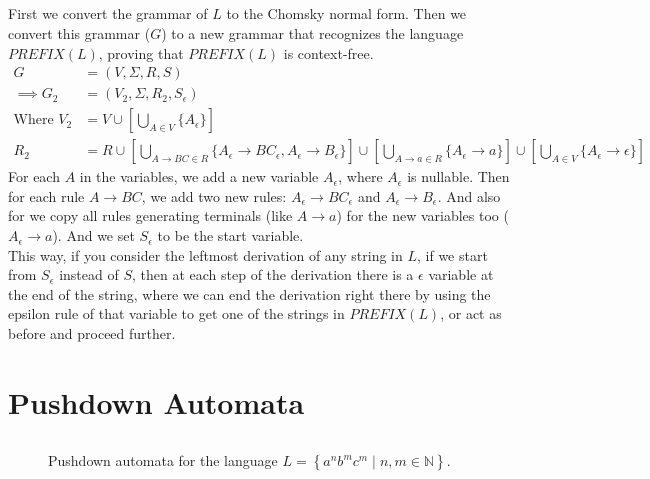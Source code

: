 \documentclass{article}
\numberwithin{equation}{subsection}
\begin{document}
\subsection{}
First we convert the grammar of \(L\) to the Chomsky normal form. Then we convert this grammar (\(G\)) to a new grammar that recognizes the language \(PREFIX(L)\), proving that \(PREFIX(L)\) is context-free.
\begin{align*}
G &= (V, \Sigma, R, S)\\
\implies G_2 &= (V_2, \Sigma, R_2, S_\epsilon)\\
\text{Where } V_2 &= V \cup \left[\bigcup_{A \in V} \{A_\epsilon\}\right]\\
R_2 &= R \cup \left[\bigcup_{A\rightarrow BC \in R} \{A_\epsilon \rightarrow BC_\epsilon, A_\epsilon \rightarrow B_\epsilon\}\right] \cup \left[\bigcup_{A \rightarrow a \in R} \{A_\epsilon \rightarrow a\}\right] \cup \left[\bigcup_{A \in V} \{A_\epsilon \rightarrow \epsilon\}\right]
\end{align*}
For each \(A\) in the variables, we add a new variable \(A_\epsilon\), where \(A_\epsilon\) is nullable.
Then for each rule \(A \rightarrow BC\), we add two new rules: \(A_\epsilon \rightarrow BC_\epsilon\) and \(A_\epsilon \rightarrow B_\epsilon\). 
And also for we copy all rules generating terminals (like \(A \rightarrow a\)) for the new variables too (\(A_\epsilon \rightarrow a\)).
And we set \(S_\epsilon\) to be the start variable.\\
This way, if you consider the leftmost derivation of any string in \(L\), if we start from \(S_\epsilon\) instead of \(S\), then at each step of the derivation there is a \(\epsilon\) variable at the end of the string, where we can end the derivation right there by using the epsilon rule of that variable to get one of the strings in \(PREFIX(L)\), or act as before and proceed further.

\section{Pushdown Automata}
\subsection{}
\subsubsection{}
\begin{figure}[H]
\centering

\caption{Pushdown automata for the language \(L=\left\{a^nb^mc^m\mid n, m \in \mathbb{N}\right\}\).}
\label{fig:automata3-1}
\end{figure}
\end{document}
